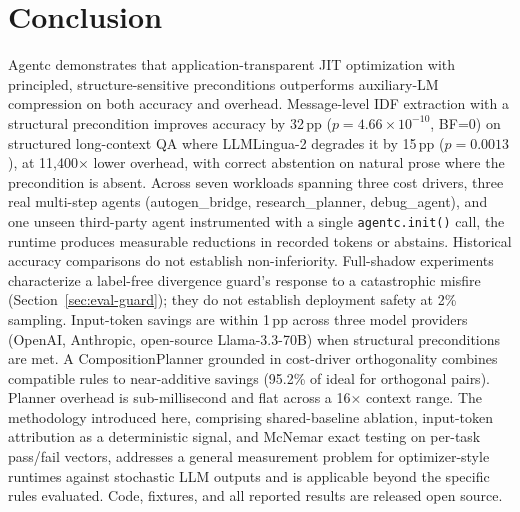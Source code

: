 \section{Conclusion}
\label{sec:conclusion}

Agentc demonstrates that application-transparent JIT optimization with principled,
structure-sensitive preconditions outperforms auxiliary-LM compression on both
accuracy and overhead. Message-level IDF extraction with a structural precondition
improves accuracy by 32\,pp ($p=4.66\times10^{-10}$, BF=0) on structured long-context
QA where LLMLingua-2 degrades it by 15\,pp ($p=0.0013$), at 11{,}400$\times$ lower
overhead, with correct abstention on natural prose where the precondition is absent.
Across seven workloads spanning three cost drivers, three real multi-step agents
(autogen\_bridge, research\_planner, debug\_agent), and one unseen third-party agent
instrumented with a single \texttt{agentc.init()} call, the runtime produces
measurable reductions in recorded tokens or abstains. Historical accuracy
comparisons do not establish non-inferiority. Full-shadow experiments characterize a label-free divergence
guard's response to a catastrophic misfire (Section~\ref{sec:eval-guard}); they do
not establish deployment safety at 2\% sampling. Input-token savings are within 1\,pp across
three model providers (OpenAI, Anthropic, open-source Llama-3.3-70B) when structural
preconditions are met. A CompositionPlanner grounded in cost-driver orthogonality
combines compatible rules to near-additive savings (95.2\% of ideal for orthogonal
pairs). Planner overhead is sub-millisecond and flat across a 16$\times$ context
range. The methodology introduced here, comprising shared-baseline ablation,
input-token attribution as a deterministic signal, and McNemar exact testing on
per-task pass/fail vectors, addresses a general measurement problem for
optimizer-style runtimes against stochastic LLM outputs and is applicable beyond the
specific rules evaluated. Code, fixtures, and all reported results are released open
source.





